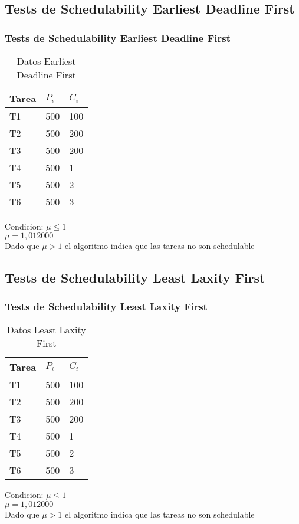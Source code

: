 \documentclass[xcolor=table]{beamer}
\begin{document}
\subsection{Tests de Schedulability  Earliest Deadline First } 

\begin{frame} 
\frametitle{Tests de Schedulability  Earliest Deadline First } 
\begin{table} 
\centering 
\begin{tabular}{|l|l|l|} 
\hline 
\cellcolor{lightgray}Tarea & \cellcolor{lightgray}$P_i$ & \cellcolor{lightgray}$C_i$ \\ \hline 
T1   & 500  &  100\\ \hline 
T2   & 500  &  200\\ \hline 
T3   & 500  &  200\\ \hline 
T4   & 500  &  1\\ \hline 
T5   & 500  &  2\\ \hline 
T6   & 500  &  3\\ \hline 
\end{tabular} 
\caption{Datos  Earliest Deadline First } 
\end{table} 
Condicion: $\mu \leq 1$ \\ 
$\mu =  1,012000 $ \\ 
Dado que $\mu>1$ el algoritmo indica que las tareas no son schedulable \\ 
\end{frame} 

\subsection{Tests de Schedulability  Least Laxity First } 

\begin{frame} 
\frametitle{Tests de Schedulability  Least Laxity First } 
\begin{table} 
\centering 
\begin{tabular}{|l|l|l|} 
\hline 
\cellcolor{lightgray}Tarea & \cellcolor{lightgray}$P_i$ & \cellcolor{lightgray}$C_i$ \\ \hline 
T1   & 500  &  100\\ \hline 
T2   & 500  &  200\\ \hline 
T3   & 500  &  200\\ \hline 
T4   & 500  &  1\\ \hline 
T5   & 500  &  2\\ \hline 
T6   & 500  &  3\\ \hline 
\end{tabular} 
\caption{Datos  Least Laxity First } 
\end{table} 
Condicion: $\mu \leq 1$ \\ 
$\mu =  1,012000 $ \\ 
Dado que $\mu>1$ el algoritmo indica que las tareas no son schedulable \\ 
\end{frame} 
\end{document}
